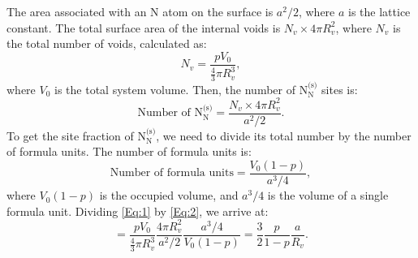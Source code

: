 \documentclass[preprint,12pt,sort&compress]{elsarticle}
\newcommand{\?}{\stackrel{?}{=}}
\providecommand{\DIFaddend}{\protect\color{black}} %
\DeclareRobustCommand{\DIFaddend}{\DIFOaddend \let\includegraphics\DIFOincludegraphics} %
\begin{document}
\DIFaddend The area associated with an N atom on the surface is $a^2/2$, where $a$ is the lattice constant. The total surface area of the internal voids is $N_v \times 4 \pi R_v^2$, where $N_v$ is the total number of voids, calculated as:
\begin{equation}
N_v = \frac{ p V_0 }{ \frac{4}{3} \pi R_v^3 },
\end{equation}
where $V_0$ is the total system volume. Then, the number of $\text{N}_\text{N}^\text{(s)}$ sites is:
\begin{equation}
\text{Number of } \text{N}_\text{N}^\text{(s)} = \frac{ N_v \times 4 \pi R_v^2 }{ a^2 / 2 }. 
\label{Eq:1}
\end{equation}
To get the site fraction of $\text{N}_\text{N}^\text{(s)}$, we need to divide its total number by the number of formula units. The number of formula units is:
\begin{equation}
\text{Number of formula units} = \frac{V_0 (1 - p)}{ a^3 / 4 }, 
\label{Eq:2}
\end{equation}
where $V_0 (1 - p)$ is the occupied volume, and $a^3 / 4$ is the volume of a single formula unit. Dividing \cref{Eq:1} by \cref{Eq:2}, we arrive at:
\begin{equation}
[ \text{N}_\text{N}^\text{(s)} ] = \frac{p V_0}{ \frac{4}{3} \pi R_v^3 } \frac{4 \pi R_v^2}{a^2/2}  \frac{ a^3/4 }{ V_0 (1 - p) } = \frac{3}{2} \frac{p}{1-p} \frac{a}{R_v}.
\label{Eq:NNs}
\end{equation}
\end{document}
